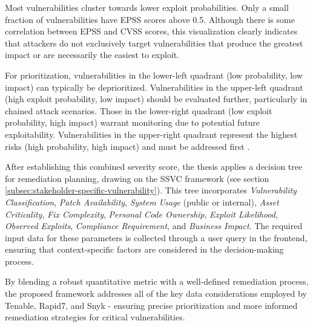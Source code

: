 Most vulnerabilities cluster towards lower exploit probabilities. Only a small fraction of vulnerabilities have \ac{EPSS} scores above 0.5. Although there is some correlation between \ac{EPSS} and \ac{CVSS} scores, this visualization clearly indicates that attackers do not exclusively target vulnerabilities that produce the greatest impact or are necessarily the easiest to exploit.

For prioritization, vulnerabilities in the lower-left quadrant (low probability, low impact) can typically be deprioritized. Vulnerabilities in the upper-left quadrant (high exploit probability, low impact) should be evaluated further, particularly in chained attack scenarios. Those in the lower-right quadrant (low exploit probability, high impact) warrant monitoring due to potential future exploitability. Vulnerabilities in the upper-right quadrant represent the highest risks (high probability, high impact) and must be addressed first \autocite{first_epss_2021}.

After establishing this combined severity score, the thesis applies a decision tree for remediation planning, drawing on the \ac{SSVC} framework (see section \ref{subsec:stakeholder-specific-vulnerability}). This tree incorporates \emph{Vulnerability Classification}, \emph{Patch Availability}, \emph{System Usage} (public or internal), \emph{Asset Criticality}, \emph{Fix Complexity}, \emph{Personal Code Ownership}, \emph{Exploit Likelihood}, \emph{Observed Exploits}, \emph{Compliance Requirement}, and \emph{Business Impact}. The required input data for these parameters is collected through a user query in the frontend, ensuring that context-specific factors are considered in the decision-making process. 

By blending a robust quantitative metric with a well-defined remediation process, the proposed framework addresses all of the key data considerations employed by Tenable, Rapid7, and Snyk - ensuring precise prioritization and more informed remediation strategies for critical vulnerabilities.